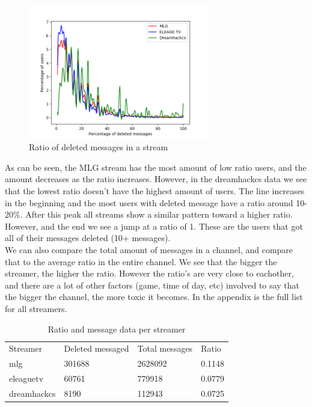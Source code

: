 \documentclass[final]{report}
\begin{document}
\begin{figure}[h]
	\centering
	\includegraphics[width=0.7\textwidth]{DeletedPerStreamer.png}
	\caption{Ratio of deleted messages in a stream}
	\label{fig:deletedPerStream}
\end{figure}

As can be seen, the MLG stream has the most amount of low ratio users, and the amount decreases as the ratio increases. However, in the dreamhackcs data we see that the lowest ratio doesn't have the highest amount of users. The line increases in the beginning and the most users with deleted message have a ratio around 10-20$\%$. After this peak all streams show a similar pattern toward a higher ratio.
However, and the end we see a jump at a ratio of 1. These are the users that got all of their messages deleted (10+ messages).\\

We can also compare the total amount of messages in a channel, and compare that to the average ratio in the entire channel. We see that the bigger the streamer, the higher the ratio. However the ratio's are very close to eachother, and there are a lot of other factors (game, time of day, etc) involved to say that the bigger the channel, the more toxic it becomes. In the appendix is the full list for all streamers.

\begin{table}[]
\centering
\caption{Ratio and message data per streamer}
\label{my-label}
\begin{tabular}{l|lll}
Streamer 		 & Deleted messaged & Total messages 	& Ratio 	\\
mlg              & 301688 			& 2628092 			& 0.1148   	\\
eleaguetv        & 60761  			& 779918  			& 0.0779   	\\
dreamhackcs      & 8190   			& 112943  			& 0.0725	\\
\end{tabular}
\end{table}
\end{document}
